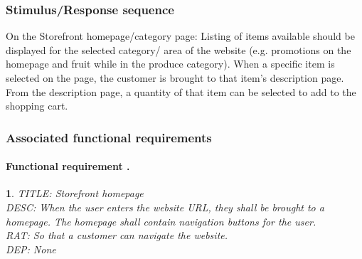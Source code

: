 \documentclass{scrreprt}
\theoremstyle{funreq}
\newtheorem{funreq}{}
\begin{document}
\subsubsection{Stimulus/Response sequence}
On the Storefront homepage/category page: Listing of items available should be displayed for the selected category/ area of the website (e.g. promotions on the homepage and fruit while in the produce category).  When a specific item is selected on the page, the customer is brought to that item’s description page.  From the description page, a quantity of that item can be selected to add to the shopping cart.  
\subsubsection{Associated functional requirements}

\paragraph[]{Functional requirement .}
\begin{funreq}
	\label{store_home}
	TITLE: Storefront homepage\\
	DESC: When the user enters the website URL, they shall be brought to a homepage.  The homepage shall contain navigation buttons for the user.\\
	RAT: So that a customer can navigate the website.\\
	DEP: None\\
\end{funreq}
\end{document}
